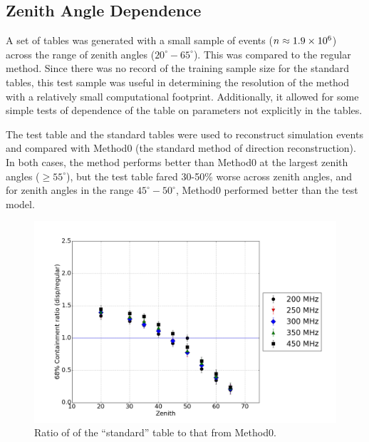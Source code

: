 \documentclass[main.tex]{subfiles}
\begin{document}
\subsection{Zenith Angle Dependence}
A set of \disp tables was generated with a small sample of events ($n\approx 1.9\times 10^{6}$) across the range of zenith angles ($20^\circ-65^\circ$). This was compared to the regular \disp method. Since there was no record of the training sample size for the standard tables, this test sample was useful in determining the resolution of the \disp method with a relatively small computational footprint. Additionally, it allowed for some simple tests of dependence of the \disp table on parameters not explicitly in the \disp tables.

The test \disp table and the standard \disp tables were used to reconstruct simulation events and compared with Method0 (the standard method of direction reconstruction). In both cases, the \disp method performs better than Method0 at the largest zenith angles ($\geq 55^\circ$), but the test \disp table fared 30-50\% worse across zenith angles, and for zenith angles in the range $45^\circ-50^\circ$, Method0 performed better than the test model. 

\begin{figure}[htbp]
  \begin{center}
      \includegraphics[width=0.8\linewidth]{images/disp_standard_ratio_xzen}
      \caption[``standard'' \disp table reconstruction.]{Ratio of \rse of the ``standard'' \disp table to that from Method0.}  
      \label{fig:olddisp_ratio}
  \end{center}
\end{figure}
\end{document}
